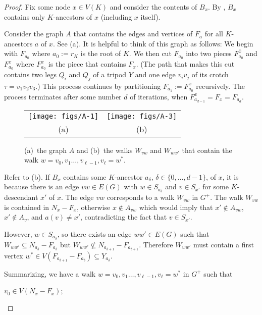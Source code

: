\documentclass{patmorin}
\begin{document}
\begin{proof}
  Fix some node $x\in V(K)$ and consider the contents of $B_x$.  By , $B_x$ contains only $K$-ancestors of $x$ (including $x$ itself). 
  
  Consider the graph $A$ that contains the edges and vertices of $F_{a}$ for all $K$-ancestors $a$ of $x$. See (a).  It is helpful to think of this graph as follows:  We begin with $F_{a_0}$ where $a_0:=r_K$ is the root of $K$.  We then cut $F_{a_0}$ into two pieces $F^{\bar{x}}_{a_0}$ and $F^x_{a_0}$ where $F^x_{a_0}$ is the piece that contains $F_x$. (The path that makes this cut contains two legs $Q_i$ and $Q_j$ of a tripod $Y$ and one edge $v_iv_j$ of its crotch $\tau=v_1v_2v_3$.)  This process continues by partitioning $F_{a_1}:=F^x_{a_0}$ recursively.  The process terminates after some number $d$ of iterations, when $F^x_{a_{d-1}}=F_x=F_{a_d}$.

  \begin{figure}
    \begin{center}
      \begin{tabular}{cc}
        \texttt{[image: figs/A-1]} &
        \texttt{[image: figs/A-3]} \\ (a) & (b)
      \end{tabular}
    \end{center}
    \caption{(a)~the graph $A$ and (b)~the walks $W_{vw}$ and $W_{ww'}$ that contain the walk $w=v_0,v_1\ldots,v_{\ell-1},v_\ell=w^*$.}
  \end{figure}

  Refer to (b).  If $B_x$ contains some $K$-ancestor $a_\delta$, $\delta\in\{0,\ldots,d-1\}$, of $x$, it is because there is an edge $vw\in E(G)$ with $w\in S_{a_\delta}$ and $v\in S_{x'}$ for some $K$-descendant $x'$ of $x$.  The edge $vw$ corresponds to a walk $W_{vw}$ in $G^+$. The walk $W_{vw}$ is contained in $N_x-F_x$, otherwise $x\not\in A_{vw}$ which would imply that $x'\not\in A_{vw}$, $x'\not\in A_v$, and $a(v)\neq x'$, contradicting the fact that $v\in S_{x'}$.
  
  However, $w\in S_{a_\delta}$, so there exists an edge $ww'\in E(G)$ such that $W_{ww'}\subseteq N_{a_\delta}-F_{a_\delta}$ but $W_{ww'}\not\subseteq N_{a_{\delta+1}}-F_{a_{\delta+1}}$.  Therefore $W_{ww'}$ must contain a first vertex $w^*\in V(F_{a_{\delta+1}}-F_{a_\delta})\subseteq Y_{a_\delta}$.

  Summarizing, we have a walk $w=v_0,v_1\ldots,v_{\ell-1},v_\ell=w^*$ in $G^+$ such that
  \begin{compactenum}[(i)]
    \item $v_0\in V(N_x-F_x)$;
    

\end{compactenum}
\end{proof}
\end{document}
